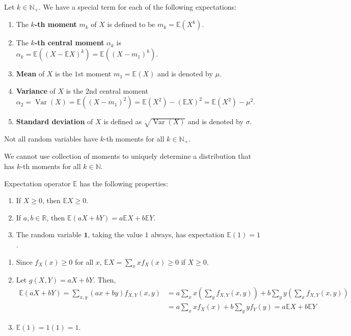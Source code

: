 \documentclass{huhtakm-template-book}
\newcommand{\expect}{\mathbb{E}}
\DeclareMathOperator{\Var}{Var}
\begin{document}
\begin{defn}
	Let $k\in\mathbb{N}_{+}$. We have a special term for each of the following expectations:
	\begin{enumerate}
		\item The \textbf{$k$-th moment} $m_{k}$ of $X$ is defined to be $m_{k}=\expect(X^{k})$.
		\item The \textbf{$k$-th central moment} $\alpha_{k}$ is $\alpha_{k}=\expect((X-\expect X)^{k})=\expect((X-m_{1})^{k})$.
		\item \textbf{Mean} of $X$ is the $1$st moment $m_{1}=\expect(X)$ and is denoted by $\mu$.
		\item \textbf{Variance} of $X$ is the $2$nd central moment $\alpha_{2}=\Var(X)=\expect((X-m_{1})^{2})=\expect(X^{2})-(\expect X)^{2}=\expect(X^{2})-\mu^{2}$.
		\item \textbf{Standard deviation} of $X$ is defined as $\sqrt{\Var(X)}$ and is denoted by $\sigma$.
	\end{enumerate}
\end{defn}
\begin{rem}
	Not all random variables have $k$-th moments for all $k\in\mathbb{N}_{+}$.
\end{rem}
\begin{rem}
	We cannot use collection of moments to uniquely determine a distribution that has $k$-th moments for all $k\in\mathbb{N}$.
\end{rem}
\begin{thm}
	Expectation operator $\expect$ has the following properties:
	\begin{enumerate}
		\item If $X\geq 0$, then $\expect X\geq 0$.
		\item If $a,b\in\mathbb{R}$, then $\expect(aX+bY)=a\expect X+b\expect Y$.
		\item The random variable $\mathbf{1}$, taking the value $1$ always, has expectation $\expect(1)=1$.
	\end{enumerate}
\end{thm}
\begin{proofing}
	\begin{enumerate}
		\item Since $f_{X}(x)\geq 0$ for all $x$, $\expect X=\sum_{x}xf_{X}(x)\geq 0$ if $X\geq 0$.
		\item Let $g(X,Y)=aX+bY$. Then,
		\begin{align*}
			\expect(aX+bY)=\sum_{x,y}(ax+by)f_{X,Y}(x,y)&=a\sum_{x}x\left(\sum_{y}f_{X,Y}(x,y)\right)+b\sum_{y}y\left(\sum_{x}f_{X,Y}(x,y)\right)\\
			&=a\sum_{x}xf_{X}(x)+b\sum_{y}yf_{Y}(y)=a\expect X+b\expect Y
		\end{align*}
		\item $\expect(1)=1(1)=1$.
	\end{enumerate}
\end{proofing}
\end{document}
